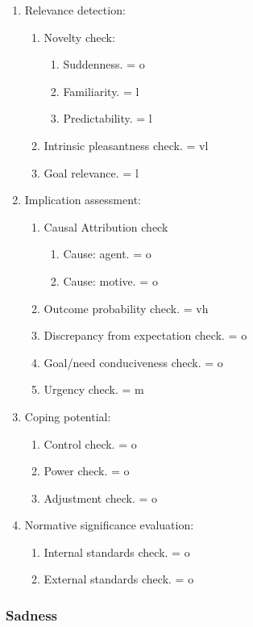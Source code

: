 \begin{enumerate}
\item  Relevance detection:
\begin{enumerate}
\item  Novelty check:
\begin{enumerate}
\item  Suddenness. = o
\item  Familiarity. = l
\item  Predictability. = l
\end{enumerate}
\item  Intrinsic pleasantness check. = vl
\item  Goal relevance. = l
\end{enumerate}
\item  Implication assessment:
\begin{enumerate}
\item  Causal Attribution check
\begin{enumerate}
\item  Cause: agent. = o
\item  Cause: motive. = o
\end{enumerate}
\item  Outcome probability check. = vh
\item  Discrepancy from expectation check. = o
\item  Goal/need conduciveness check. = o
\item  Urgency check. = m
\end{enumerate}
\item  Coping potential:
\begin{enumerate}
\item  Control check. = o
\item  Power check. = o
\item  Adjustment check. = o
\end{enumerate}
\item  Normative significance evaluation:
\begin{enumerate}
\item  Internal standards check. = o
\item  External standards check. = o
\end{enumerate}
\end{enumerate}


\subsubsection{Sadness}

